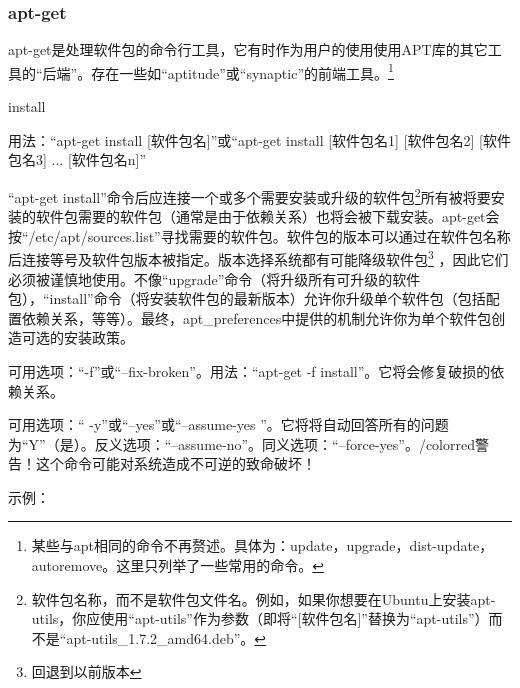 \documentclass{book}
\begin{document}
\subsubsection{apt-get}
\cite{manaptget}\par
apt-get是处理软件包的命令行工具，它有时作为用户的使用使用APT库的其它工具的“后端”。存在一些如“aptitude”或“synaptic”的前端工具。\footnote{某些与apt相同的命令不再赘述。具体为：update，upgrade，dist-update，autoremove。这里只列举了一些常用的命令。} \par
\begin{center} install \end{center}
用法：“apt-get install [软件包名]”或“apt-get install [软件包名1] [软件包名2] [软件包名3] ... [软件包名n]”\par
“apt-get install”命令后应连接一个或多个需要安装或升级的软件包\footnote{软件包名称，而不是软件包文件名。例如，如果你想要在Ubuntu上安装apt-utils，你应使用“apt-utils”作为参数（即将“[软件包名]”替换为“apt-utils”）而不是“apt-utils\_1.7.2\_amd64.deb”。}所有被将要安装的软件包需要的软件包（通常是由于依赖关系）也将会被下载安装。apt-get会按“/etc/apt/sources.list”寻找需要的软件包。软件包的版本可以通过在软件包名称后连接等号及软件包版本被指定。版本选择系统都有可能降级软件包\footnote{回退到以前版本} ，因此它们必须被谨慎地使用。不像“upgrade”命令（将升级所有可升级的软件包），“install”命令（将安装软件包的最新版本）允许你升级单个软件包（包括配置依赖关系，等等）。最终，apt\_preferences中提供的机制允许你为单个软件包创造可选的安装政策。\par
可用选项：“-f”或“--fix-broken”。用法：“apt-get -f install”。它将会修复破损的依赖关系。\par
可用选项：“ -y”或“--yes”或“--assume-yes ”。它将将自动回答所有的问题为“Y”（是）。反义选项：“--assume-no”。同义选项：“--force-yes”。{/color{red}{警告！这个命令可能对系统造成不可逆的致命破坏！}}\par
示例：
\end{document}
